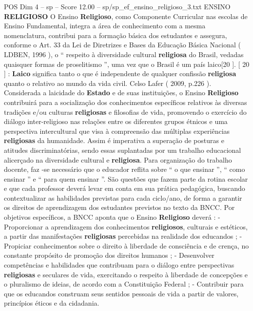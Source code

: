 \begin{textsample}{POS Dim 4 – sp – Score 12.00 – sp/sp\_ef\_ensino\_religioso\_3.txt}  \label{ex:f4_pos_251}
ENSINO \textbf{RELIGIOSO} O Ensino \textbf{Religioso}, como Componente Curricular nas escolas de Ensino Fundamental, integra a área de conhecimento com a mesma nomenclatura, contribui para a formação básica dos estudantes e assegura, conforme o Art. 33 da Lei de Diretrizes e Bases da Educação Básica Nacional ( LDBEN, 1996 ), o “ respeito à diversidade cultural \textbf{religiosa} do Brasil, vedadas quaisquer formas de proselitismo ”, uma vez que o Brasil é um país laico[20 ]. [ 20 ] : \textbf{Laico} significa tanto o que é independente de qualquer confissão \textbf{religiosa} quanto o relativo ao mundo da vida civil.
Celso Lafer ( 2009, p.226 ).
Considerada a laicidade do \textbf{Estado} e de suas instituições, o Ensino \textbf{Religioso} contribuirá para a socialização dos conhecimentos específicos relativos às diversas tradições e/ou culturas \textbf{religiosas} e filosofias de vida, promovendo o exercício do diálogo inter-religioso nas relações entre os diferentes grupos étnicos e uma perspectiva intercultural que visa à compreensão das múltiplas experiências \textbf{religiosas} da humanidade.
Assim é imperativa a superação de posturas e atitudes discriminatórias, sendo essas suplantadas por um trabalho educacional alicerçado na diversidade cultural e \textbf{religiosa}.
Para organização do trabalho docente, faz -se necessário que o educador reflita sobre “ o que ensinar ”, “ como ensinar ” e “ para quem ensinar ”.
São questões que fazem parte da rotina escolar e que cada professor deverá levar em conta em sua prática pedagógica, buscando contextualizar as habilidades previstas para cada ciclo/ano, de forma a garantir os direitos de aprendizagem dos estudantes previstos no texto da BNCC.
Por objetivos específicos, a BNCC aponta que o Ensino \textbf{Religioso} deverá : - Proporcionar a aprendizagem dos conhecimentos \textbf{religiosos}, culturais e estéticos, a partir das manifestações \textbf{religiosas} percebidas na realidade dos educandos ; - Propiciar conhecimentos sobre o direito à liberdade de consciência e de crença, no constante propósito de promoção dos direitos humanos ; - Desenvolver competências e habilidades que contribuam para o diálogo entre perspectivas \textbf{religiosas} e seculares de vida, exercitando o respeito à liberdade de concepções e o pluralismo de ideias, de acordo com a Constituição Federal ; - Contribuir para que os educandos construam seus sentidos pessoais de vida a partir de valores, princípios éticos e da cidadania.

\end{textsample}

